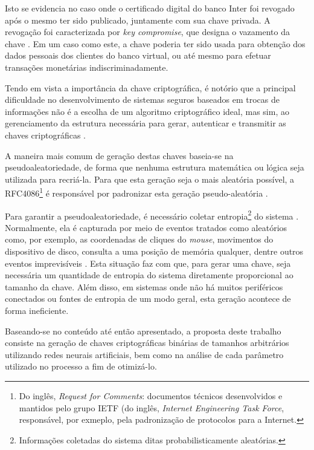 \documentclass[a4paper,10pt,oneside,conference,final,keeplastbox]{inatel}
\newcommand{\internet}{Internet\xspace}
\begin{document}
        Isto se evidencia no caso onde o certificado digital do banco Inter foi revogado após o mesmo ter sido publicado, juntamente com sua chave privada. A revogação foi caracterizada por \textit{key compromise}, que designa o vazamento da chave \cite{rohr2018inter}. Em um caso como este, a chave poderia ter sido usada para obtenção dos dados pessoais dos clientes do banco virtual, ou até mesmo para efetuar transações monetárias indiscriminadamente.
    
        Tendo em vista a importância da chave criptográfica, é notório que a principal dificuldade no desenvolvimento de sistemas seguros baseados em trocas de informações não é a escolha de um algoritmo criptográfico ideal, mas sim, ao gerenciamento da estrutura necessária para gerar, autenticar e transmitir as chaves criptográficas \cite{al2003certificateless}.
    
        A maneira mais comum de geração destas chaves baseia-se na pseudoaleatoriedade, de forma que nenhuma estrutura matemática ou lógica seja utilizada para recriá-la. Para que esta geração seja o mais aleatória possível, a RFC4086\footnote{Do inglês, \textit{Request for Comments}: documentos técnicos desenvolvidos e mantidos pelo grupo IETF (do inglês, \textit{Internet Engineering Task Force}, responsável, por exmeplo, pela padronização de protocolos para a \internet.} é responsável por padronizar esta geração pseudo-aleatória \cite{ntwg2005rfc4086}.
    
        Para garantir a pseudoaleatoriedade, é necessário coletar entropia\footnote{Informações coletadas do sistema ditas probabilisticamente aleatórias.} do sistema \cite{ristenpart2010randomness}. Normalmente, ela é capturada por meio de eventos tratados como aleatórios como, por exemplo, as coordenadas de cliques do \textit{mouse}, movimentos do dispositivo de disco, consulta a uma posição de memória qualquer, dentre outros eventos imprevisíveis \cite{young2004malicious}. Esta situação faz com que, para gerar uma chave, seja necessária um quantidade de entropia do sistema diretamente proporcional ao tamanho da chave. Além disso, em sistemas onde não há muitos periféricos conectados ou fontes de entropia de um modo geral, esta geração acontece de forma ineficiente.
    
        Baseando-se no conteúdo até então apresentado, a proposta deste trabalho consiste na geração de chaves criptográficas binárias de tamanhos arbitrários utilizando redes neurais artificiais, bem como na análise de cada parâmetro utilizado no processo a fim de otimizá-lo.
    
\end{document}

